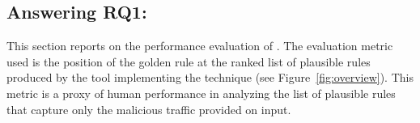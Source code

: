 \documentclass[sigconf,review, anonymous]{acmart}
\begin{document}



\subsection{Answering RQ1: \textRQone}
\label{sec:answer-rqone}

This section reports on the performance evaluation of \tname. The
evaluation metric used is the position of the golden rule at the
ranked list of plausible rules produced by the tool implementing the
technique (see Figure~\ref{fig:overview}). This metric is a proxy of
human performance in analyzing the list of plausible rules that
capture only the malicious traffic provided on input.
\end{document}
